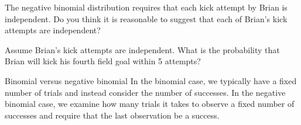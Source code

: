\begin{exercisewrap}
\begin{nexercise}
The negative binomial distribution requires that each kick attempt by Brian is independent. Do you think it is reasonable to suggest that each of Brian's kick attempts are independent?\footnotemark
\end{nexercise}
\end{exercisewrap}

\begin{exercisewrap}
\begin{nexercise}
Assume Brian's kick attempts are independent. What is the probability that Brian will kick his fourth field goal within 5 attempts?\footnotemark
\end{nexercise}
\end{exercisewrap}

\begin{onebox}{Binomial versus negative binomial}
  In the binomial case, we typically have a fixed number
  of trials and instead consider the number of successes.
  In the negative binomial case, we examine how many trials
  it takes to observe a fixed number of successes and
  require that the last observation be a success.
\end{onebox}


